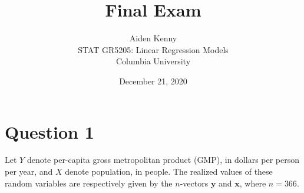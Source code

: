 \documentclass[10pt]{article}
\title{
    {\Large Final Exam}
}
\author{
    {\normalsize Aiden Kenny}\\
    {\normalsize STAT GR5205: Linear Regression Models}\\
    {\normalsize Columbia University}
}
\date{\normalsize December 21, 2020}
\begin{document}
\maketitle

\newcommand{\rx}{X}
\newcommand{\ry}{Y}
\newcommand{\rz}{Z}
\newcommand{\E}{\mathbb{E}}

\section{Question 1} \noindent
Let \(\ry\) denote per-capita gross metropolitan product (GMP), in dollars per person per year, and \(\rx\) denote population, in people. 
The realized values of these random variables are respectively given by the \(n\)-vectors \(\mathbf{y}\) and \(\mathbf{x}\), where \(n = 366\).
\end{document}
